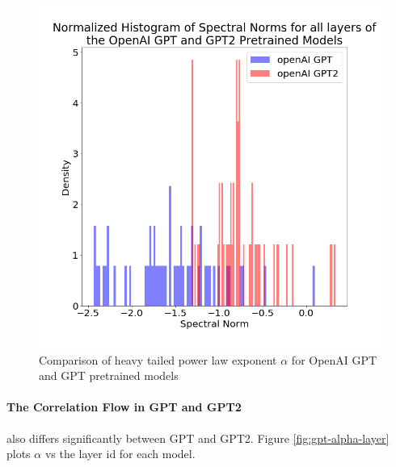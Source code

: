 \begin{figure}
   \includegraphics[scale=0.25]{img/gpt-alpha-hist.png}
   \caption{Comparison of heavy tailed power law exponent $\alpha$ for OpenAI GPT and GPT pretrained models}
   \label{fig:gpt-alpha-hist.png}
\end{figure}


\paragraph{The Correlation Flow in GPT and GPT2} also differs significantly between GPT and GPT2.
Figure \ref{fig:gpt-alpha-layer} plots $\alpha$ vs the layer id for each model.



